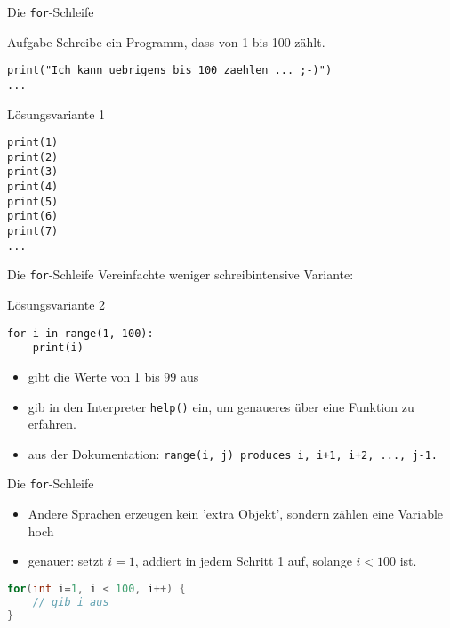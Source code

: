 \begin{frame}[fragile]{Die \texttt{for}-Schleife}
\begin{block}{Aufgabe}
    Schreibe ein Programm, dass von 1 bis 100 zählt.
    \begin{lstlisting}
print("Ich kann uebrigens bis 100 zaehlen ... ;-)")
...
    \end{lstlisting}
\end{block}
\pause{}
\begin{exampleblock}{Lösungsvariante 1}
    \begin{lstlisting}
print(1)
print(2)
print(3)
print(4)
print(5)
print(6)
print(7)
...
    \end{lstlisting}
\end{exampleblock}
\end{frame}

\begin{frame}[fragile]{Die \texttt{for}-Schleife}
Vereinfachte weniger schreibintensive Variante:
\begin{exampleblock}{Lösungsvariante 2}
    \begin{lstlisting}
for i in range(1, 100):
    print(i)
    \end{lstlisting}
\end{exampleblock}
\begin{itemize}
    \item gibt die Werte von 1 bis 99 aus
    \pause{} 
    \item gib in den Interpreter \texttt{help()} ein, um genaueres über 
    eine Funktion zu erfahren. 
    \pause{}
    \item aus der Dokumentation: \texttt{range(i, j) produces i, i+1, i+2, ..., j-1.}
\end{itemize}
\end{frame}

\begin{frame}[fragile]{Die \texttt{for}-Schleife}
\begin{itemize}
    \item Andere Sprachen erzeugen kein 'extra Objekt', sondern zählen eine 
    Variable hoch
    \item genauer: setzt $i=1$, addiert in jedem Schritt 1 auf, 
    solange $i < 100$ ist. 
\end{itemize}
\begin{lstlisting}[language=Java]
for(int i=1, i < 100, i++) {
    // gib i aus
}
\end{lstlisting}
\end{frame}

